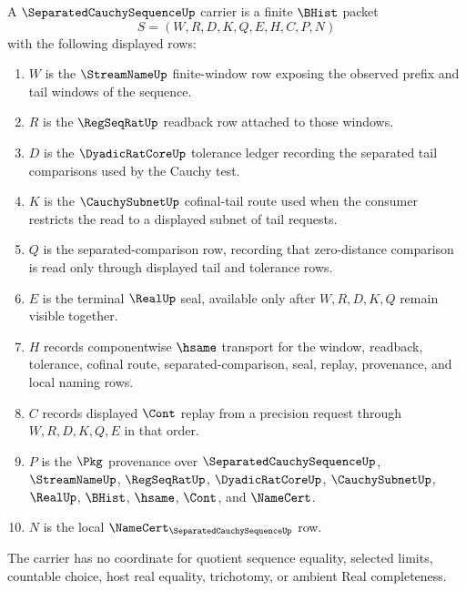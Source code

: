 \begin{definition}
\label{def:separated-cauchy-sequence-carrier}
A $\SeparatedCauchySequenceUp$ carrier is a finite $\BHist$ packet
$$
S=(W,R,D,K,Q,E,H,C,P,N)
$$
with the following displayed rows:
\begin{enumerate}
\item $W$ is the $\StreamNameUp$ finite-window row exposing the observed prefix and tail windows of the sequence.
\item $R$ is the $\RegSeqRatUp$ readback row attached to those windows.
\item $D$ is the $\DyadicRatCoreUp$ tolerance ledger recording the separated tail comparisons used by the Cauchy test.
\item $K$ is the $\CauchySubnetUp$ cofinal-tail route used when the consumer restricts the read to a displayed subnet of tail requests.
\item $Q$ is the separated-comparison row, recording that zero-distance comparison is read only through displayed tail and tolerance rows.
\item $E$ is the terminal $\RealUp$ seal, available only after $W,R,D,K,Q$ remain visible together.
\item $H$ records componentwise $\hsame$ transport for the window, readback, tolerance, cofinal route, separated-comparison, seal, replay, provenance, and local naming rows.
\item $C$ records displayed $\Cont$ replay from a precision request through $W,R,D,K,Q,E$ in that order.
\item $P$ is the $\Pkg$ provenance over $\SeparatedCauchySequenceUp$, $\StreamNameUp$, $\RegSeqRatUp$, $\DyadicRatCoreUp$, $\CauchySubnetUp$, $\RealUp$, $\BHist$, $\hsame$, $\Cont$, and $\NameCert$.
\item $N$ is the local $\NameCert_{\SeparatedCauchySequenceUp}$ row.
\end{enumerate}
The carrier has no coordinate for quotient sequence equality, selected limits, countable choice, host real equality, trichotomy, or ambient Real completeness.
\end{definition}

